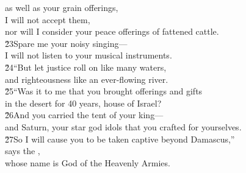 \begin{poetry}
\poemll    as well as your grain offerings, \\
\poeml I will not accept them, \\
\poemll    nor will I consider your peace offerings of fattened cattle. \\
\poeml \v{23}Spare me your noisy singing--- \\
\poemll    I will not listen to your musical instruments. \\
\poeml \v{24}``But let justice roll on like many waters, \\
\poemll    and righteousness like an ever-flowing river. \\
\poeml \v{25}``Was it to me that you brought offerings and gifts \\
\poemll    in the desert for 40 years, house of Israel? \\
\poeml \v{26}And you carried the tent of your king--- \\
\poemll    and Saturn, your star god idols that you crafted for yourselves. \\
\poeml \v{27}So I will cause you to be taken captive beyond Damascus,'' \\
\poemll    says the , \\
\poemlll       whose name is God of the Heavenly Armies.
\end{poetry}


